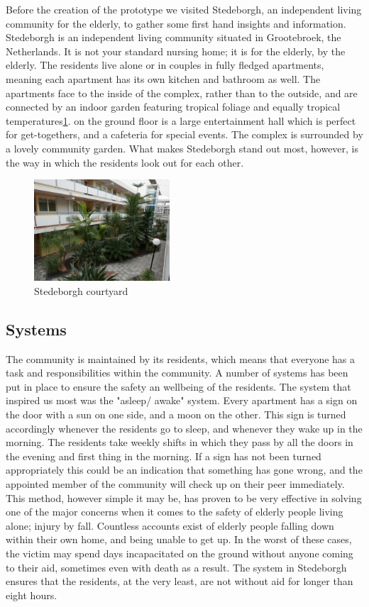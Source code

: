 \documentclass{below-ext}
\begin{document}
Before the creation of the prototype we visited Stedeborgh, an independent living community for the elderly, to gather some first hand insights and information. Stedeborgh is an independent living community situated in Grootebroek, the Netherlands.  It is not your standard nursing home; it is for the elderly, by the elderly. The residents live alone or in couples in fully fledged apartments, meaning each apartment has its own kitchen and bathroom as well. The apartments face to the inside of the complex, rather than to the outside, and are connected by an indoor garden featuring tropical foliage and equally tropical temperatures\ref{fig:stedeborgh}. on the ground floor is a large entertainment hall which is perfect for get-togethers, and a cafeteria for special events. The complex is surrounded by a lovely community garden. What makes Stedeborgh stand out most, however, is the way in which the residents look out for each other.\\
\vspace{0.2cm}
\begin{figure}
\centering
\label{fig:stedeborgh}
\includegraphics[width=0.45\textwidth]{stedeborgh}
\caption{Stedeborgh courtyard}
\end{figure}

\subsection{Systems}
The community is maintained by its residents, which means that everyone has a task and responsibilities within the community. A number of systems has been put in place to ensure the safety an wellbeing of the residents. The system that inspired us most was the "asleep/ awake" system. Every apartment has a sign on the door with a sun on one side, and a moon on the other. This sign is turned accordingly whenever the residents go to sleep, and whenever they wake up in the morning. The residents take weekly shifts in which they pass by all the doors in the evening and first thing in the morning. If a sign has not been turned appropriately this could be an indication that something has gone wrong, and the appointed member of the community will check up on their peer immediately. This method, however simple it may be, has proven to be very effective in solving one of the major concerns when it comes to the safety of elderly people living alone; injury by fall. Countless accounts exist of elderly people falling down within their own home, and being unable to get up. In the worst of these cases, the victim may spend days incapacitated on the ground without anyone coming to their aid, sometimes even with death as a result. The system in Stedeborgh ensures that the residents, at the very least, are not without aid for longer than eight hours. 
\end{document}
